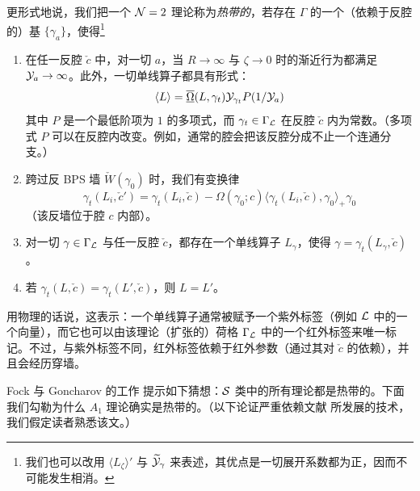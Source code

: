 更形式地说，我们把一个 $\mathcal{N}=2$ 理论称为\emph{热带的}，若存在 $\Gamma$ 的一个（依赖于反腔的）基 $\{\gamma_a\}$，使得\footnote{我们也可以改用 $\langle L_\zeta\rangle'$ 与 $\widetilde{\mathcal{Y}}_\gamma$ 来表述，其优点是一切展开系数都为正，因而不可能发生相消。}

\begin{enumerate}
\item 在任一反腔 $\check c$ 中，对一切 $a$，当 $R\to\infty$ 与 $\zeta\to 0$ 时的渐近行为都满足 $\mathcal{Y}_a\to\infty$。此外，一切单线算子都具有形式：
\begin{equation}
\langle L\rangle = \overline{\underline{\Omega}}(L,\gamma_t)\mathcal{Y}_{\gamma_t}P(1/\mathcal{Y}_a)
\end{equation}
其中 $P$ 是一个最低阶项为 $1$ 的多项式，而 $\gamma_t\in\Gamma_{\mathcal{L}}$ 在反腔 $\check c$ 内为常数。（多项式 $P$ 可以在反腔内改变。例如，通常的腔会把该反腔分成不止一个连通分支。）

\item 跨过反 BPS 墙 $\check W(\gamma_0)$ 时，我们有变换律
\begin{equation}\label{eq:Tropical-Transformation}
\gamma_t(L_i,\check c') = \gamma_t(L_i,\check c) - \Omega(\gamma_0;c)\langle\gamma_t(L_i,\check c),\gamma_0\rangle_+ \gamma_0
\end{equation}
（该反墙位于腔 $c$ 内部）。

\item 对一切 $\gamma\in\Gamma_{\mathcal{L}}$ 与任一反腔 $\check c$，都存在一个单线算子 $L_\gamma$，使得 $\gamma=\gamma_t(L_\gamma,\check c)$。

\item 若 $\gamma_t(L,\check c)=\gamma_t(L',\check c)$，则 $L=L'$。
\end{enumerate}

用物理的话说，这表示：一个单线算子通常被赋予一个紫外标签（例如 $\mathcal{L}$ 中的一个向量），而它也可以由该理论（扩张的）荷格 $\Gamma_{\mathcal{L}}$ 中的一个红外标签来唯一标记。不过，与紫外标签不同，红外标签依赖于红外参数（通过其对 $\check c$ 的依赖），并且会经历穿墙。

Fock 与 Goncharov 的工作 \cite{MR2233852} 提示如下猜想：$\mathcal{S}$ 类中的所有理论都是热带的。下面我们勾勒为什么 $A_1$ 理论确实是热带的。（以下论证严重依赖文献 \cite{Gaiotto:2009hg} 所发展的技术，我们假定读者熟悉该文。）

